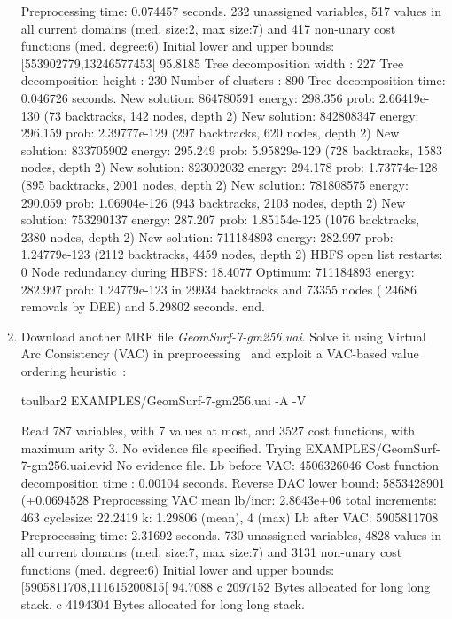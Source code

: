 \begin{enumerate}
{\begin{DoxyCode}
Preprocessing time: 0.074457 seconds.
232 unassigned variables, 517 values in all current domains (med. size:2, max size:7) and 417 non-unary cost functions (med. degree:6)
Initial lower and upper bounds: [553902779,13246577453[ 95.8185%
Tree decomposition width  : 227
Tree decomposition height : 230
Number of clusters        : 890
Tree decomposition time: 0.046726 seconds.
New solution: 864780591 energy: 298.356 prob: 2.66419e-130 (73 backtracks, 142 nodes, depth 2)
New solution: 842808347 energy: 296.159 prob: 2.39777e-129 (297 backtracks, 620 nodes, depth 2)
New solution: 833705902 energy: 295.249 prob: 5.95829e-129 (728 backtracks, 1583 nodes, depth 2)
New solution: 823002032 energy: 294.178 prob: 1.73774e-128 (895 backtracks, 2001 nodes, depth 2)
New solution: 781808575 energy: 290.059 prob: 1.06904e-126 (943 backtracks, 2103 nodes, depth 2)
New solution: 753290137 energy: 287.207 prob: 1.85154e-125 (1076 backtracks, 2380 nodes, depth 2)
New solution: 711184893 energy: 282.997 prob: 1.24779e-123 (2112 backtracks, 4459 nodes, depth 2)
HBFS open list restarts: 0 %
Node redundancy during HBFS: 18.4077 %
Optimum: 711184893 energy: 282.997 prob: 1.24779e-123 in 29934 backtracks and 73355 nodes ( 24686 removals by DEE) and 5.29802 seconds.
end.
\end{DoxyCode}}
\item Download another MRF file {\em GeomSurf-7-gm256.uai}. Solve it using Virtual Arc Consistency (VAC) in preprocessing~\cite{Cooper08} and exploit a VAC-based value ordering heuristic~\cite{Cooper10a}:
\begin{DoxyCode}
	toulbar2 EXAMPLES/GeomSurf-7-gm256.uai -A -V
\end{DoxyCode}
{\scriptsize
\begin{DoxyCode}
Read 787 variables, with 7 values at most, and 3527 cost functions, with maximum arity 3.
No evidence file specified. Trying EXAMPLES/GeomSurf-7-gm256.uai.evid
No evidence file. 
Lb before VAC: 4506326046
Cost function decomposition time : 0.00104 seconds.
Reverse DAC lower bound: 5853428901 (+0.0694528%
Preprocessing VAC mean lb/incr: 2.8643e+06     total increments: 463     cyclesize: 22.2419     k: 1.29806 (mean), 4 (max)
Lb after VAC: 5905811708
Preprocessing time: 2.31692 seconds.
730 unassigned variables, 4828 values in all current domains (med. size:7, max size:7) and 3131 non-unary cost functions (med. degree:6)
Initial lower and upper bounds: [5905811708,111615200815[ 94.7088%
c 2097152 Bytes allocated for long long stack.
c 4194304 Bytes allocated for long long stack.

\end{DoxyCode}}
\end{enumerate}
